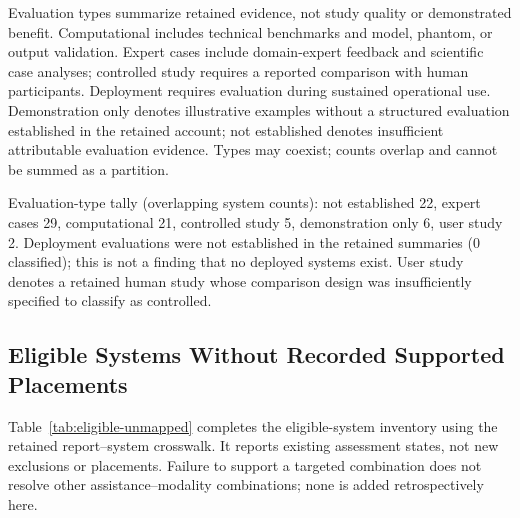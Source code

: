 \documentclass[11pt]{article}
\begin{document}
Evaluation types summarize retained evidence, not study quality or demonstrated benefit. Computational includes technical benchmarks and model, phantom, or output validation. Expert cases include domain-expert feedback and scientific case analyses; controlled study requires a reported comparison with human participants. Deployment requires evaluation during sustained operational use. Demonstration only denotes illustrative examples without a structured evaluation established in the retained account; not established denotes insufficient attributable evaluation evidence. Types may coexist; counts overlap and cannot be summed as a partition.

\noindent Evaluation-type tally (overlapping system counts): not established 22, expert cases 29, computational 21, controlled study 5, demonstration only 6, user study 2. Deployment evaluations were not established in the retained summaries (0 classified); this is not a finding that no deployed systems exist. User study denotes a retained human study whose comparison design was insufficiently specified to classify as controlled.

\clearpage



\subsection{Eligible Systems Without Recorded Supported Placements}
\label{sec:eligible-unmapped}
Table~\ref{tab:eligible-unmapped} completes the eligible-system inventory using the retained report--system crosswalk. It reports existing assessment states, not new exclusions or placements. Failure to support a targeted combination does not resolve other assistance--modality combinations; none is added retrospectively here.
\end{document}
